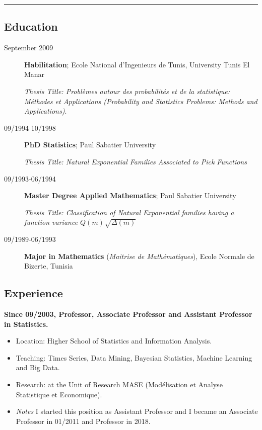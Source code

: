 \documentclass[]{article}
\begin{document}
\begin{center}\rule{0.5\linewidth}{\linethickness}\end{center}

\subsection{Education}\label{education}

\begin{description}
\item[September 2009]
\textbf{Habilitation}; Ecole National d'Ingenieurs de Tunis, University
Tunis El Manar

\emph{Thesis Title: Problèmes autour des probabilités et de la
statistique: Méthodes et Applications (Probability and Statistics
Problems: Methods and Applications)}.
\item[09/1994-10/1998]
\textbf{PhD Statistics}; Paul Sabatier University

\emph{Thesis Title: Natural Exponential Families Associated to Pick
Functions}
\item[09/1993-06/1994]
\textbf{Master Degree Applied Mathematics}; Paul Sabatier University

\emph{Thesis Title: Classification of Natural Exponential families
having a function variance \(Q(m)\sqrt{\Delta(m)}\)}
\item[09/1989-06/1993]
\textbf{Major in Mathematics} (\emph{Maitrise de Mathématiques}), Ecole
Normale de Bizerte, Tunisia
\end{description}

\subsection{Experience}\label{experience}

\textbf{Since 09/2003, Professor, Associate Professor and Assistant
Professor in Statistics.}

\begin{itemize}
\item
  Location: Higher School of Statistics and Information Analysis.
\item
  Teaching: Times Series, Data Mining, Bayesian Statistics, Machine
  Learning and Big Data.
\item
  Research: at the Unit of Research MASE (Modélisation et Analyse
  Statistique et Economique).
\item
  \emph{Notes} I started this position as Assistant Professor and I
  became an Associate Professor in 01/2011 and Professor in 2018.
\end{itemize}
\end{document}
